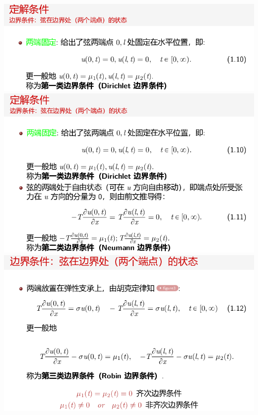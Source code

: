 \documentclass[11pt,a4paper]{ctexart}
\begin{document}
\begin{paracol}{2}
\includegraphics[width=\linewidth]{chap01_21.png}
\includegraphics[width=\linewidth]{chap01_22.png}
\includegraphics[width=\linewidth]{chap01_23.png}
\newpage


\end{paracol}
\end{document}
